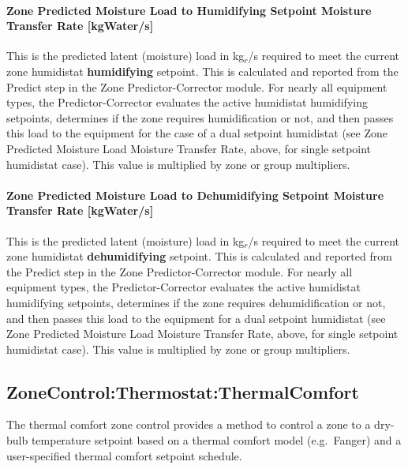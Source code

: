 \paragraph{Zone Predicted Moisture Load to Humidifying Setpoint Moisture Transfer Rate {[}kgWater/s{]}}\label{zone-predicted-moisture-load-to-humidifying-setpoint-moisture-transfer-rate-kgwaters}

This is the predicted latent (moisture) load in kg\(_{r}\)/s required to meet the current zone humidistat \textbf{humidifying} setpoint. This is calculated and reported from the Predict step in the Zone Predictor-Corrector module. For nearly all equipment types, the Predictor-Corrector evaluates the active humidistat humidifying setpoints, determines if the zone requires humidification or not, and then passes this load to the equipment for the case of a dual setpoint humidistat (see Zone Predicted Moisture Load Moisture Transfer Rate, above, for single setpoint humidistat case). This value is multiplied by zone or group multipliers.

\paragraph{Zone Predicted Moisture Load to Dehumidifying Setpoint Moisture Transfer Rate {[}kgWater/s{]}}\label{zone-predicted-moisture-load-to-dehumidifying-setpoint-moisture-transfer-rate-kgwaters}

This is the predicted latent (moisture) load in kg\(_{r}\)/s required to meet the current zone humidistat \textbf{dehumidifying} setpoint. This is calculated and reported from the Predict step in the Zone Predictor-Corrector module. For nearly all equipment types, the Predictor-Corrector evaluates the active humidistat humidifying setpoints, determines if the zone requires dehumidification or not, and then passes this load to the equipment for a dual setpoint humidistat (see Zone Predicted Moisture Load Moisture Transfer Rate, above, for single setpoint humidistat case). This value is multiplied by zone or group multipliers.

\subsection{ZoneControl:Thermostat:ThermalComfort}\label{zonecontrolthermostatthermalcomfort}

The thermal comfort zone control provides a method to control a zone to a dry-bulb temperature setpoint based on a thermal comfort model (e.g.~Fanger) and a user-specified thermal comfort setpoint schedule.

